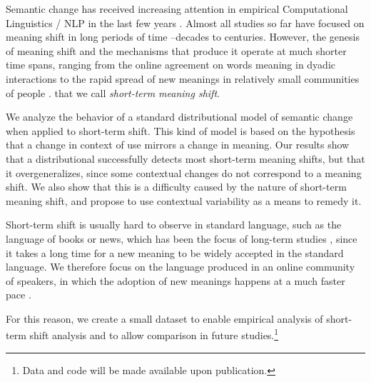 Semantic change has received increasing attention in empirical Computational Linguistics / NLP in the last few years \cite{tang2018state}. Almost all studies so far have focused on meaning shift in long periods of time --decades to centuries. However, the genesis of meaning shift and the mechanisms that produce it operate at much shorter time spans, ranging
from the online agreement on words meaning in dyadic interactions \cite{brennan1996conceptual} to the rapid spread of new meanings in relatively small communities of people \cite{del2017semantic,del2018road}. 
that we call \textit{short-term meaning shift}.

We  analyze the
 behavior of a standard distributional model of semantic change when
 applied to short-term shift.
This kind of model is based on the hypothesis that a change in context of use mirrors a change in meaning.
Our results show that a distributional successfully detects most short-term meaning shifts, but that it overgeneralizes, since some contextual changes do not correspond to a meaning shift.
We also show that this is a difficulty caused by the nature of short-term meaning shift, and propose to use contextual variability as a means to remedy it.

 

Short-term shift is usually hard to observe in standard language, such
as the language of books or news, which has been the focus of
long-term studies \cite{hamilton2016diachronic,kulkarni2015statistically}, since
it takes a long time for a new meaning to be widely accepted in the standard language. 
We therefore focus on the language produced in an online community of speakers, in which the 
adoption of new meanings happens at a much faster pace \cite{Clark96,hasan2009}.

For this reason, we create a small dataset to enable empirical analysis of short-term
shift analysis and to allow comparison in future studies.\footnote{Data and code will be made available upon
publication.}





